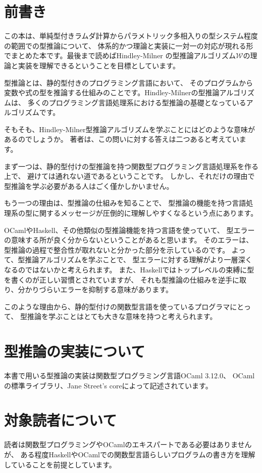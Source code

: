
\section*{前書き}

この本は、単純型付きラムダ計算からパラメトリック多相入りの型システム程度の範囲での型推論について、
体系的かつ理論と実装に一対一の対応が現れる形でまとめた本です。最後まで読めばHindley-Milner
の型推論アルゴリズム$\mathcal W$の理論と実装を理解できるということを目標としています。

型推論とは、静的型付きのプログラミング言語において、
そのプログラムから変数や式の型を推論する仕組みのことです。Hindley-Milnerの型推論アルゴリズムは、
多くのプログラミング言語処理系における型推論の基礎となっているアルゴリズムです。

そもそも、Hindley-Milner型推論アルゴリズムを学ぶことにはどのような意味があるのでしょうか。
著者は、この問いに対する答えは二つあると考えています。

まず一つは、静的型付けの型推論を持つ関数型プログラミング言語処理系を作る上で、
避けては通れない道であるということです。
しかし、それだけの理由で型推論を学ぶ必要がある人はごく僅かしかいません。

もう一つの理由は、型推論の仕組みを知ることで、
型推論の機能を持つ言語処理系の型に関するメッセージが圧倒的に理解しやすくなるという点にあります。

OCamlやHaskell、その他類似の型推論機能を持つ言語を使っていて、
型エラーの意味する所が良く分からないということがあると思います。
そのエラーは、型推論の過程で整合性が取れないと分かった部分を示しているのです。
よって、型推論アルゴリズムを学ぶことで、
型エラーに対する理解がより一層深くなるのではないかと考えられます。
また、Haskellではトップレベルの束縛に型を書くのが正しい習慣とされていますが、
それも型推論の仕組みを逆手に取り、分かりづらいエラーを抑制する意味があります。

このような理由から、静的型付けの関数型言語を使っているプログラマにとって、
型推論を学ぶことはとても大きな意味を持つと考えられます。

\section*{型推論の実装について}

本書で用いる型推論の実装は関数型プログラミング言語OCaml 3.12.0、
OCamlの標準ライブラリ、Jane Street's coreによって記述されています。

\section*{対象読者について}

読者は関数型プログラミングやOCamlのエキスパートである必要はありませんが、
ある程度HaskellやOCamlでの関数型言語らしいプログラムの書き方を理解していることを前提としています。

